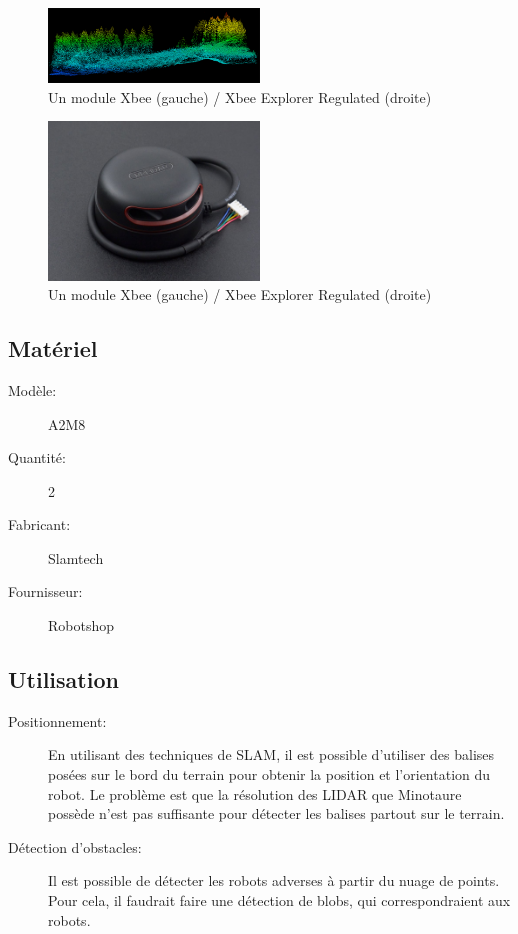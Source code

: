 \documentclass[a4paper, 11pt]{report}
\begin{document}
\begin{figure}[h]
\caption{Un module Xbee (gauche) / Xbee Explorer Regulated (droite)}

\begin{centering}
\includegraphics[width=0.5\textwidth]{images/NuageDePoints.png}
\par\end{centering}
\end{figure}

\begin{figure}[h]
\caption{Un module Xbee (gauche) / Xbee Explorer Regulated (droite)}
\begin{centering}
\includegraphics[width=0.5\textwidth]{images/RPLidar.jpg}
\par\end{centering}
\end{figure}

\subsection{Matériel}
\begin{description}
\item[Modèle:] A2M8
\item[Quantité:]2
\item[Fabricant:]Slamtech
\item[Fournisseur:]Robotshop
\end{description}


\subsection{Utilisation}
\begin{description}
\item[Positionnement:]En utilisant des techniques de SLAM, il est possible d'utiliser des balises posées sur le bord du terrain pour obtenir la position et l'orientation du robot. Le problème est que la résolution des LIDAR que Minotaure possède n'est pas suffisante pour détecter les balises partout sur le terrain.
\item[Détection d'obstacles:] Il est possible de détecter les robots adverses à partir du nuage de points. Pour cela, il faudrait faire une détection de blobs, qui correspondraient aux robots.
\end{description}
\end{document}
